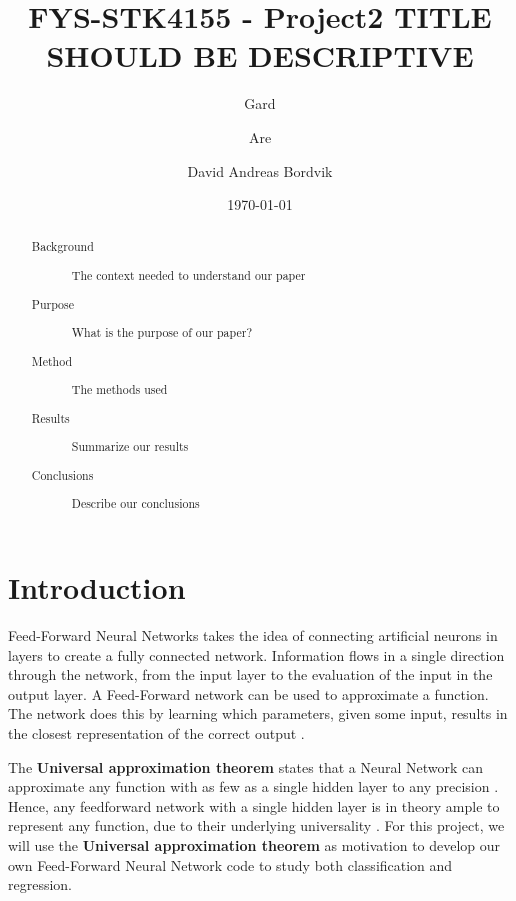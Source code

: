 \documentclass
[twocolumn,
secnumarabic,
nobibnotes,
aps,
prl,
reprint,
groupedaddress,
amsmath,
amssymb
]{revtex4-2}
\begin{document}

\title{FYS-STK4155 - Project2 TITLE SHOULD BE DESCRIPTIVE}

\author{Gard}
\author{Are}
\author{David Andreas Bordvik}
\date{\today}

\begin{abstract}
  \begin{description}
    \item[Background] The context needed to understand our paper
    \item[Purpose] What is the purpose of our paper?
    \item[Method] The methods used
    \item[Results] Summarize our results
    \item[Conclusions] Describe our conclusions
  \end{description}
\end{abstract}

\maketitle

\section{Introduction}
Feed-Forward Neural Networks takes the idea of connecting artificial neurons in layers to create a fully connected network. Information flows in a single direction through the network, from the input layer to the evaluation of the input in the output layer. A Feed-Forward network can be used to approximate a function. The network does this by learning which parameters, given some input, results in the closest representation of the correct output \cite{Goodfellow2016}.

The \textbf{Universal approximation theorem} states that a Neural Network can approximate any function with as few as a single hidden layer to any precision \cite{Hornik1989, Cybenko1989}. Hence, any feedforward network with a single hidden layer is in theory ample to represent any function, due to their underlying universality \cite{Nielsen2015}. For this project, we will use the \textbf{Universal approximation theorem} as motivation to develop our own Feed-Forward Neural Network code to study both classification and regression.
\end{document}
